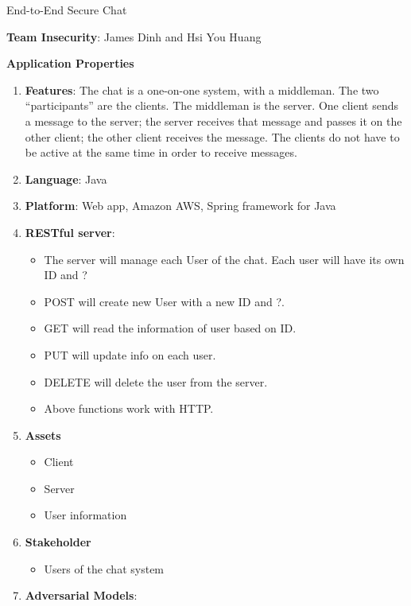 \documentclass{article}
\begin{document}
End-to-End Secure Chat\newline

\textbf{Team Insecurity}: James Dinh and Hsi You Huang\newline

\textbf{Application Properties}\newline

\begin{enumerate}
	\item \textbf{Features}: The chat is a one-on-one system, with a middleman. The two
     “participants” are the clients. The middleman is the server. One client sends a message to the
     server; the server receives that message and passes it on the other client; the other client 
     receives the message. The clients do not have to be active at the same time in order to receive
     messages.
	\item \textbf{Language}: Java
    \item \textbf{Platform}: Web app, Amazon AWS, Spring framework for Java
    \item \textbf{RESTful server}:
    	\begin{itemize}
    		\item The server will manage each User of the chat. Each user will have its own ID and ?
         	\item POST will create new User with a new ID and ?.
            \item GET will read the information of user based on ID.
            \item PUT will update info on each user.
            \item DELETE will delete the user from the server.
            \item Above functions work with HTTP.
        \end{itemize}
	\item \textbf{Assets}
    	\begin{itemize}
        	\item Client
            \item Server
            \item User information
        \end{itemize} 
    \item \textbf{Stakeholder}
    	\begin{itemize}
        	\item Users of the chat system
        \end{itemize}
    \item \textbf{Adversarial Models}:

\end{enumerate}
\end{document}
